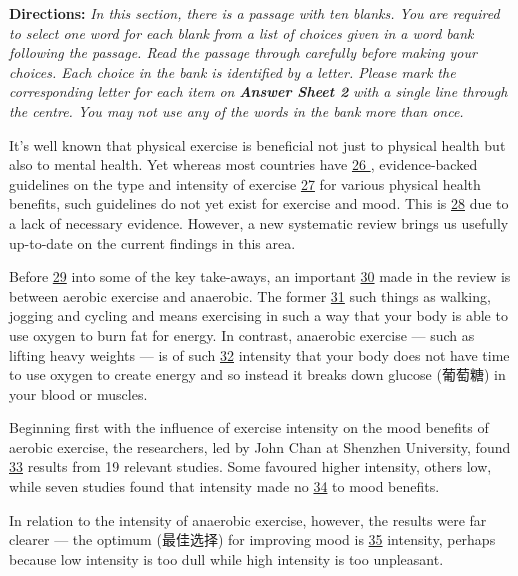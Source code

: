 \documentclass[UTF8,11pt]{ctexart}
\begin{document}
\textbf{Directions:} \textit{In this section, there is a passage with ten blanks. You are required to select one word for each blank} \textit{from a list of choices given in a word bank following the passage. Read the passage through carefully before} \textit{making your choices. Each choice in the bank is identified by a letter. Please mark the corresponding letter for} \textit{each item on }\textbf{\textit{Answer Sheet 2}}\textit{ with a single line through the centre. You may not use any of the words in the bank} \textit{more than once.}


It’s well known that physical exercise is beneficial not just to physical health but also to mental health. Yet whereas most countries have \uline{26 }, evidence-backed guidelines on the type and intensity of exercise \uline{27} for various physical health benefits, such guidelines do not yet exist for exercise and mood. This is \uline{28} due to a lack of necessary evidence. However, a new systematic review brings us usefully up-to-date on the current findings in this area.


Before \uline{29} into some of the key take-aways, an important \uline{30} made in the review is between aerobic exercise and anaerobic. The former \uline{31} such things as walking, jogging and cycling and means exercising in such a way that your body is able to use oxygen to burn fat for energy. In contrast, anaerobic exercise — such as lifting heavy weights — is of such \uline{32} intensity that your body does not have time to use oxygen to create energy and so instead it breaks down glucose (葡萄糖) in your blood or muscles.


Beginning first with the influence of exercise intensity on the mood benefits of aerobic exercise, the researchers, led by John Chan at Shenzhen University, found \uline{33} results from 19 relevant studies. Some favoured higher intensity, others low, while seven studies found that intensity made no \uline{34} to mood benefits.


In relation to the intensity of anaerobic exercise, however, the results were far clearer — the optimum (最佳选择) for improving mood is \uline{35} intensity, perhaps because low intensity is too dull while high intensity is too unpleasant.
\end{document}
